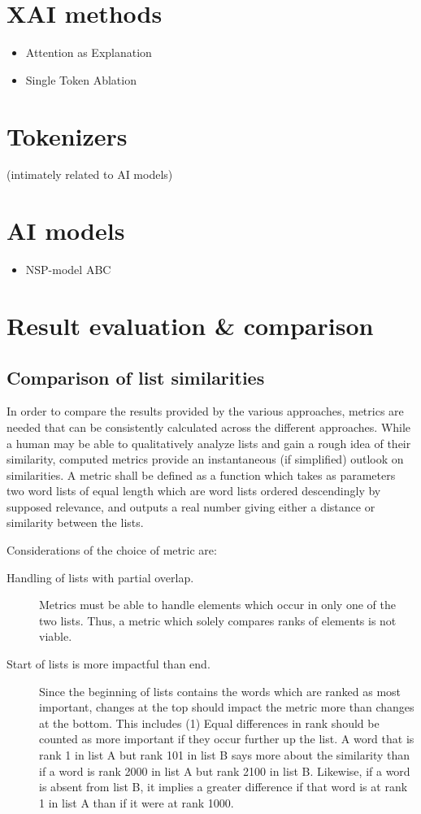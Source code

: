 
\section{XAI methods}
\begin{itemize}
	\item Attention as Explanation
	\item Single Token Ablation
\end{itemize}

\section{Tokenizers}
(intimately related to AI models)
\section{AI models}
\begin{itemize}
	\item NSP-model ABC
\end{itemize}

\section{Result evaluation \& comparison}

\subsection{Comparison of list similarities}
In order to compare the results provided by the various approaches, metrics are needed that can be consistently calculated across the different approaches.
While a human may be able to qualitatively analyze lists and gain a rough idea of their similarity, computed metrics provide an instantaneous (if simplified) outlook on similarities.
A metric shall be defined as a function which takes as parameters two word lists of equal length which are word lists ordered descendingly by supposed relevance, and outputs a real number giving either a distance or similarity between the lists.

Considerations of the choice of metric are:

\begin{description}
	\item [Handling of lists with partial overlap.]
	      Metrics must be able to handle elements which occur in only one of the two lists.
	      Thus, a metric which solely compares ranks of elements is not viable.
	\item [Start of lists is more impactful than end.]
		Since the beginning of lists contains the words which are ranked as most important, changes at the top should impact the metric more than changes at the bottom. This includes (1) Equal differences in rank should be counted as more important if they occur further up the list.
	      A word that is rank 1 in list A but rank 101 in list B says more about the similarity than if a word is rank 2000 in list A but rank 2100 in list B. Likewise, if a word is absent from list B, it implies a greater difference if that word is at rank 1 in list A than if it were at rank 1000.
\end{description}

